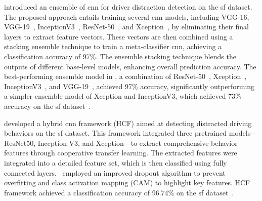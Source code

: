 \citet{61_MIM_Sup_dhakate2020distracted} introduced an ensemble of \gls{cnn} for driver distraction detection on the \gls{sf} dataset. The proposed approach entails training several \gls{cnn} models, including VGG-16, VGG-19~\citep{VGG_16_simonyan2014very}, InceptionV3~\citep{Inception_V3_szegedy2016rethinking}, ResNet-50~\citep{Resnet_50_he2016deep}, and Xception~\citep{Xception_chollet2017xception}, by eliminating their final layers to extract feature vectors. These vectors are then combined using a stacking ensemble technique to train a meta-classifier \gls{cnn}, achieving a classification accuracy of 97\%. The ensemble stacking technique blends the outputs of different base-level models, enhancing overall prediction accuracy. The best-performing ensemble model in \citep{61_MIM_Sup_dhakate2020distracted} , a combination of ResNet-50~\citep{Resnet_50_he2016deep}, Xception~\citep{Xception_chollet2017xception}, InceptionV3~\citep{Inception_V3_szegedy2016rethinking}, and VGG-19~\citep{VGG_16_simonyan2014very}, achieved 97\% accuracy, significantly outperforming a simpler ensemble model of Xception and InceptionV3, which achieved 73\% accuracy on the \gls{sf} dataset~\citep{61_MIM_Sup_dhakate2020distracted}.

\citet{56_MIM_HCF_9113267} developed a hybrid \gls{cnn} framework (HCF) aimed at detecting distracted driving behaviors on the \gls{sf} dataset. This framework integrated three pretrained models—ResNet50, Inception V3, and Xception—to extract comprehensive behavior features through cooperative transfer learning. The extracted features were integrated into a detailed feature set, which is then classified using fully connected layers.~\citet{56_MIM_HCF_9113267} employed an improved dropout algorithm to prevent overfitting and class activation mapping (CAM) to highlight key features. HCF framework achieved a classification accuracy of 96.74\% on the \gls{sf} dataset~\citep{56_MIM_HCF_9113267}. 

